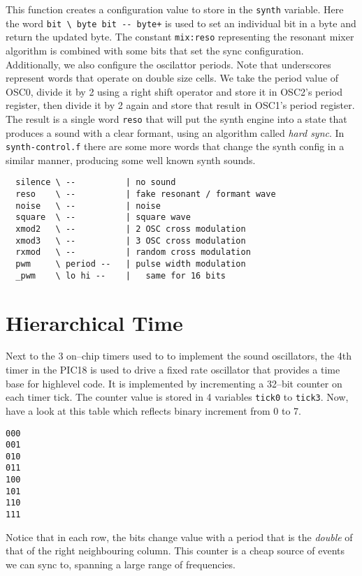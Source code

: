 \documentclass[12pt]{article}
\begin{document}
This function creates a configuration value to store in the
\verb|synth| variable. Here the word \verb|bit \ byte bit -- byte+| is
used to set an individual bit in a byte and return the updated byte.
The constant \verb|mix:reso| representing the resonant mixer algorithm
is combined with some bits that set the sync configuration.
Additionally, we also configure the oscilattor periods. Note that
underscores represent words that operate on double size cells.  We
take the period value of OSC0, divide it by 2 using a right shift
operator and store it in OSC2's period register, then divide it by 2
again and store that result in OSC1's period register. The result is a
single word \verb|reso| that will put the synth engine into a state
that produces a sound with a clear formant, using an algorithm called
\emph{hard sync}. In \verb|synth-control.f| there are some more words
that change the synth config in a similar manner, producing some well
known synth sounds.
\begin{verbatim}
  silence \ --          | no sound
  reso    \ --          | fake resonant / formant wave
  noise   \ --          | noise
  square  \ --          | square wave    
  xmod2   \ --          | 2 OSC cross modulation
  xmod3   \ --          | 3 OSC cross modulation
  rxmod   \ --          | random cross modulation
  pwm     \ period --   | pulse width modulation
  _pwm    \ lo hi --    |   same for 16 bits
\end{verbatim}



\section{Hierarchical Time}

Next to the 3 on--chip timers used to to implement the sound
oscillators, the 4th timer in the PIC18 is used to drive a fixed rate
oscillator that provides a time base for highlevel code. It is
implemented by incrementing a 32--bit counter on each timer tick. The
counter value is stored in 4 variables \verb|tick0| to \verb|tick3|.
Now, have a look at this table which reflects binary increment from 0
to 7.
\begin{samepage}
\begin{verbatim}
000
001
010
011
100
101
110
111
\end{verbatim}
\end{samepage}
Notice that in each row, the bits change value with a period that is
the \emph{double} of that of the right neighbouring column. This
counter is a cheap source of events we can sync to, spanning a
large range of frequencies. 
\end{document}
